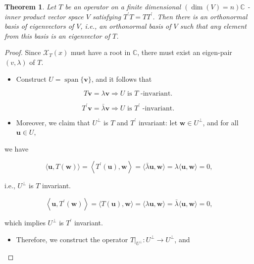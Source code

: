 \documentclass[11pt]{article}
\newtheorem{theorem}{Theorem}[section]
\begin{document}
\begin{theorem} Let \(T\) be an operator on a finite dimensional \(\left( {\dim \left( V\right)  = n}\right) \mathbb{C}\) -inner product vector space \(V\) satisfying \({T}^{\prime }T = T{T}^{\prime }\). Then there is an orthonormal basis of eigenvectors of \(V\), i.e., an orthonormal basis of \(V\) such that any element from this basis is an eigenvector of \(T\).
\end{theorem}
\begin{proof} Since \({\mathcal{X}}_{T}\left( x\right)\) must have a root in \(\mathbb{C}\), there must exist an eigen-pair \(\left( {v,\lambda }\right)\) of \(T\).

\begin{itemize}
\item Construct \(U = \operatorname{span}\{ \mathbf{v}\}\), and it follows that
\end{itemize}

\[
T\mathbf{v} = \lambda \mathbf{v} \Rightarrow  U\text{ is }T\text{ -invariant. }
\]

\[
{T}^{\prime }\mathbf{v} = \bar{\lambda }\mathbf{v} \Rightarrow  U\text{ is }{T}^{\prime }\text{ -invariant. }
\]

\begin{itemize}
\item Moreover, we claim that \({U}^{ \bot  }\) is \(T\) and \({T}^{\prime }\) invariant: let \(\mathbf{w} \in  {U}^{ \bot  }\), and for all \(\mathbf{u} \in  U\),
\end{itemize}

we have

\[
\langle \mathbf{u},T\left( \mathbf{w}\right) \rangle  = \left\langle  {{T}^{\prime }\left( \mathbf{u}\right) ,\mathbf{w}}\right\rangle   = \langle \bar{\lambda }\mathbf{u},\mathbf{w}\rangle  = \lambda \langle \mathbf{u},\mathbf{w}\rangle  = 0,
\]

i.e., \({U}^{ \bot  }\) is \(T\) invariant.

\[
\left\langle  {\mathbf{u},{T}^{\prime }\left( \mathbf{w}\right) }\right\rangle   = \langle T\left( \mathbf{u}\right) ,\mathbf{w}\rangle  = \langle \lambda \mathbf{u},\mathbf{w}\rangle  = \bar{\lambda }\langle \mathbf{u},\mathbf{w}\rangle  = 0,
\]

which implies \({U}^{ \bot  }\) is \({T}^{\prime }\) invariant.

\begin{itemize}
\item Therefore, we construct the operator \({\left. T\right| }_{{U}^{ \bot  }} : {U}^{ \bot  } \rightarrow  {U}^{ \bot  }\), and
\end{itemize}


\end{proof}
\end{document}
